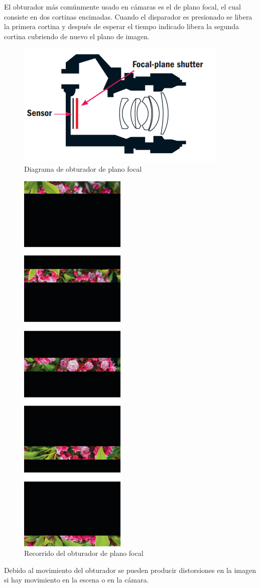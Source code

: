 \documentclass{article}
\begin{document}
El obturador más comúnmente usado en cámaras es el de plano focal, el cual consiste en dos cortinas encimadas. Cuando el disparador es presionado se libera la primera cortina y después de esperar el tiempo indicado libera la segunda cortina cubriendo de nuevo el plano de imagen.

\begin{figure}[H]
	\centering
	\includegraphics[width=0.55\linewidth]{Figuras/Focal_Plane_Shutter}
	\caption{Diagrama de obturador de plano focal}
	\label{fig:focalplaneshutter}
\end{figure}

\begin{figure}[H]
	\centering
	\includegraphics[width=0.20\linewidth]{Figuras/Focal_Plane_Shutter_2}
	\caption{Recorrido del obturador de plano focal}
	\label{fig:focalplaneshutter2}
\end{figure}

Debido al movimiento del obturador se pueden producir distorsiones en la imagen si hay movimiento en la escena o en la cámara.
\end{document}
